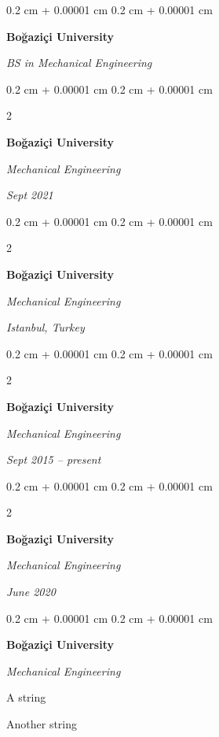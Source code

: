\documentclass[10pt, letterpaper]{article}
\newenvironment{summary}{
    \begin{description}[
        topsep=0.10 cm,
        parsep=0.10 cm,
        partopsep=0pt,
        itemsep=0pt,
        leftmargin=0.4 cm + 10pt
    ]
}{
    \end{description}
} %
\newenvironment{onecolentry}{
    \begin{adjustwidth}{
        0.2 cm + 0.00001 cm
    }{
        0.2 cm + 0.00001 cm
    }
}{
    \end{adjustwidth}
} %
\newenvironment{twocolentry}[2][]{
    \onecolentry
    \def\secondColumn{#2}
    \setcolumnwidth{\fill, 4.5 cm}
    \begin{paracol}{2}
}{
    \switchcolumn \raggedleft \secondColumn
    \end{paracol}
    \endonecolentry
} %
\begin{document}
        \begin{onecolentry}
            \textbf{Boğaziçi University}

            \textit{BS in Mechanical Engineering}
        \end{onecolentry}


        \vspace{0.2 cm}

        \begin{twocolentry}{
            
            
        \textit{Sept 2021}}
            \textbf{Boğaziçi University}

            \textit{Mechanical Engineering}
        \end{twocolentry}


        \vspace{0.2 cm}

        \begin{twocolentry}{
        \textit{Istanbul, Turkey}    
            
        }
            \textbf{Boğaziçi University}

            \textit{Mechanical Engineering}
        \end{twocolentry}


        \vspace{0.2 cm}

        \begin{twocolentry}{
            
            
        \textit{Sept 2015 – present}}
            \textbf{Boğaziçi University}

            \textit{Mechanical Engineering}
        \end{twocolentry}


        \vspace{0.2 cm}

        \begin{twocolentry}{
            
            
        \textit{June 2020}}
            \textbf{Boğaziçi University}

            \textit{Mechanical Engineering}
        \end{twocolentry}


        \vspace{0.2 cm}

        \begin{onecolentry}
            \textbf{Boğaziçi University}

            \textit{Mechanical Engineering}
        \end{onecolentry}
            \begin{summary}
                \item A string
                \item Another string
            \end{summary}
\end{document}
